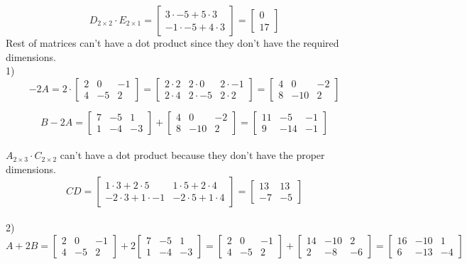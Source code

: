\documentclass[a4paper]{article}
\begin{document}
\[D_{2\times2} \cdot E_{2\times1}=
\begin{bmatrix}
3\cdot-5+5\cdot3\\
-1\cdot-5+4\cdot3
\end{bmatrix}=
\begin{bmatrix}
0\\
17
\end{bmatrix}
\]
Rest of matrices can't have a dot product since they don't have the required dimensions.\\

1) \\
\[-2A = 2\cdot
\begin{bmatrix}
2&0&-1\\
4&-5&2
\end{bmatrix}=
\begin{bmatrix}
2\cdot2&2\cdot0&2\cdot-1\\
2\cdot4&2\cdot-5&2\cdot2
\end{bmatrix}=
\begin{bmatrix}
4&0&-2\\
8&-10&2
\end{bmatrix}
\]

\[B - 2A=
\begin{bmatrix}
7&-5&1\\
1&-4&-3
\end{bmatrix}+
\begin{bmatrix}
4&0&-2\\
8&-10&2
\end{bmatrix}=
\begin{bmatrix}
11&-5&-1\\
9&-14&-1
\end{bmatrix}
\]\\
$A_{2\times3} \cdot C_{2\times2}$ can't have a dot product because they don't have the proper dimensions.\\
\[C D=
\begin{bmatrix}
1\cdot3+2\cdot5&1\cdot5+2\cdot4\\
-2\cdot3+1\cdot-1&-2\cdot5+1\cdot4
\end{bmatrix}=
\begin{bmatrix}
13&13\\
-7&-5
\end{bmatrix}
\]\\

2) \\

\[A +2B=
\begin{bmatrix}
2&0&-1\\
4&-5&2
\end{bmatrix}+2
\begin{bmatrix}
7&-5&1\\
1&-4&-3
\end{bmatrix}=
\begin{bmatrix}
2&0&-1\\
4&-5&2
\end{bmatrix}+
\begin{bmatrix}
14&-10&2\\
2&-8&-6
\end{bmatrix}=
\begin{bmatrix}
16&-10&1\\
6&-13&-4
\end{bmatrix}
\]
\end{document}
